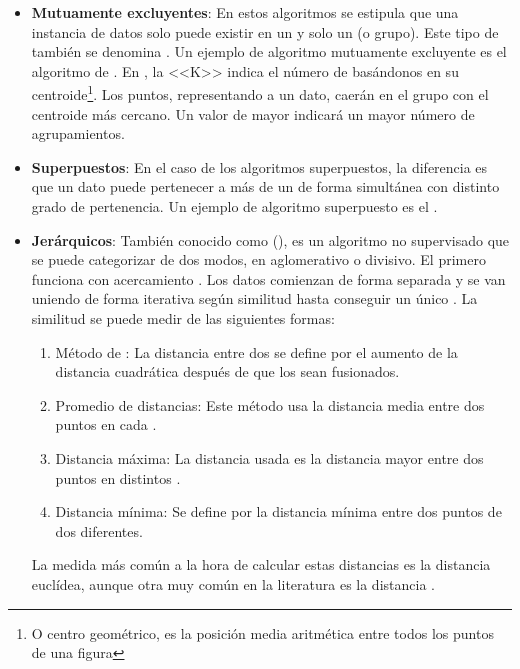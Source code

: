 \begin{itemize}
  \item \textbf{Mutuamente excluyentes}: En estos algoritmos se estipula que una instancia de datos solo puede existir en un y solo un  (o grupo). Este tipo de  también se denomina . Un ejemplo de algoritmo mutuamente excluyente es el algoritmo de . En , la <<K>> indica el número de   basándonos en su centroide\footnote{O centro geométrico, es la posición media aritmética entre todos los puntos de una figura}. Los puntos, representando a un dato, caerán en el grupo con el centroide más cercano. Un valor de  mayor indicará un mayor número de agrupamientos. 

  \item \textbf{Superpuestos}: En el caso de los algoritmos superpuestos, la diferencia es que un dato puede pertenecer a más de un  de forma simultánea con distinto grado de pertenencia. Un ejemplo de algoritmo superpuesto es el .

  \item \textbf{Jerárquicos}: También conocido como  (), es un algoritmo no supervisado que se puede categorizar de dos modos, en aglomerativo o divisivo. El primero funciona con acercamiento . Los datos comienzan de forma separada y se van uniendo de forma iterativa según similitud hasta conseguir un único . La similitud se puede medir de las siguientes formas:
        \begin{enumerate}
          \item Método de : La distancia entre dos  se define por el aumento de la distancia cuadrática después de que los  sean fusionados.
          \item Promedio de distancias: Este método usa la distancia media entre dos puntos en cada .
          \item Distancia máxima: La distancia usada es la distancia mayor entre dos puntos en distintos .
          \item Distancia mínima: Se define por la distancia mínima entre dos puntos de dos  diferentes.
        \end{enumerate}
        La medida más común a la hora de calcular estas distancias es la distancia euclídea, aunque otra muy común en la literatura es la distancia .


\end{itemize}
